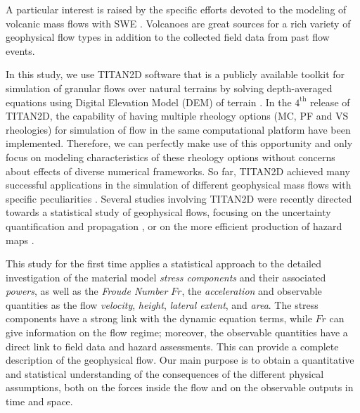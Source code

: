 \documentclass{article}
\begin{document}
A particular interest is raised by the specific efforts devoted to the modeling of volcanic mass flows with SWE \citep{FreundtBursik1998,Bursik2005,Saucedo2005, Kelfoun2005,Charbonnier2009,Kelfoun2009,Procter2010,Sulpizio2010,Kelfoun2011,Charbonnier2013}. Volcanoes are great sources for a rich variety of geophysical flow types in addition to the collected field data from past flow events.

In this study, we use TITAN2D software that is a publicly available toolkit for simulation of granular flows over natural terrains by solving depth-averaged equations using Digital Elevation Model (DEM) of terrain \citep{Pitman2003a, Patra2005, Patra2006, Yu2009, Aghakhani2016}. In the $\mathrm{4^{th}}$ release of TITAN2D, the capability of having multiple rheology options (MC, PF and VS rheologies) for simulation of flow in the same computational platform have been implemented. Therefore, we can perfectly make use of this opportunity and only focus on modeling characteristics of these rheology options without concerns about effects of diverse numerical frameworks. So far, TITAN2D achieved many successful applications in the simulation of different geophysical mass flows with specific peculiarities \citep{Sheridan2005, Rupp2006, Norini2008, Charbonnier2009, Procter2010, Sheridan2010, Sulpizio2010, Capra2011}. Several studies involving TITAN2D were recently directed towards a statistical study of geophysical flows, focusing on the uncertainty quantification and propagation \citep{Dalbey2008, Dalbey2009, Stefanescu2012b, Stefanescu2012a}, or on the more efficient production of hazard maps \citep{Bayarri2009, Spiller2014,Bayarri2015, Ogburn2016}.

This study for the first time applies a statistical approach to the detailed investigation of the material model \emph{stress components} and their associated \emph{powers}, as well as the \emph{Froude Number} $Fr$, the \emph{acceleration} and observable quantities as the flow \emph{velocity}, \emph{height}, \emph{lateral extent}, and \emph{area}. The stress components have a strong link with the dynamic equation terms, while $Fr$ can give information on the flow regime; moreover, the observable quantities have a direct link to field data and hazard assessments. This can provide a complete description of the geophysical flow. Our main purpose is to obtain a quantitative and statistical understanding of the consequences of the different physical assumptions, both on the forces inside the flow and on the observable outputs in time and space.
\end{document}
